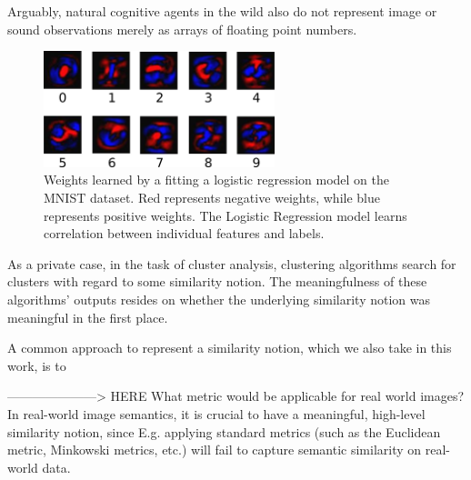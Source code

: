 \bigskip
\begin{table}[h!]
\centering
\noindent
{}
\caption{\label{tab:naive_features} Test accuracy for some common models using naïve features}
\end{table}
Arguably, natural cognitive agents in the wild also do not represent image or sound observations merely as arrays of floating point numbers.
\begin{figure}
\centering
\includegraphics[width=0.6\textwidth]{imgs/softmax-weights.png}
\caption{\label{fig:softmax-weights}  Weights learned by a fitting a logistic regression model on the MNIST dataset. Red represents negative weights, while blue represents positive weights. The Logistic Regression model learns correlation between individual features and labels.}
\end{figure}

As a private case, in the task of cluster analysis, clustering algorithms search for clusters with regard to some similarity notion. The meaningfulness of these algorithms' outputs resides on whether the underlying similarity notion was meaningful in the first place.

A common approach to represent a similarity notion, which we also take in this work, is to 

---------------------> HERE
What metric would be applicable for real world images?
In real-world image semantics, 
it is crucial to have a meaningful, high-level similarity notion, since 
E.g. applying standard metrics (such as the Euclidean metric, Minkowski metrics, etc.) will fail to capture semantic similarity on real-world data.

